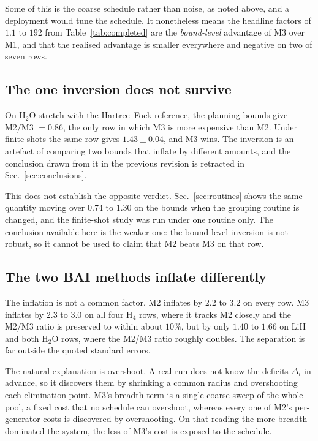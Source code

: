 \documentclass[10pt]{article}
\begin{document}
Some of this is the coarse schedule rather than noise, as noted above, and a
deployment would tune the schedule. It nonetheless means the headline factors of
$1.1$ to $192$ from Table~\ref{tab:completed} are the \emph{bound-level} advantage
of M3 over M1, and that the realised advantage is smaller everywhere and negative
on two of seven rows.

\subsection{The one inversion does not survive}

On H$_2$O stretch with the Hartree--Fock reference, the planning bounds give
M2/M3 $=0.86$, the only row in which M3 is more expensive than M2. Under finite
shots the same row gives $1.43\pm0.04$, and M3 wins. The inversion is an artefact
of comparing two bounds that inflate by different amounts, and the conclusion drawn
from it in the previous revision is retracted in Sec.~\ref{sec:conclusions}.

This does not establish the opposite verdict. Sec.~\ref{sec:routines} shows the
same quantity moving over $0.74$ to $1.30$ on the bounds when the grouping routine
is changed, and the finite-shot study was run under one routine only. The
conclusion available here is the weaker one: the bound-level inversion is not
robust, so it cannot be used to claim that M2 beats M3 on that row.

\subsection{The two BAI methods inflate differently}
\label{sec:inflate}

The inflation is not a common factor. M2 inflates by $2.2$ to $3.2$ on every row.
M3 inflates by $2.3$ to $3.0$ on all four H$_4$ rows, where it tracks M2 closely
and the M2/M3 ratio is preserved to within about $10\%$, but by only $1.40$
to $1.66$ on LiH and both H$_2$O rows, where the M2/M3 ratio roughly doubles. The
separation is far outside the quoted standard errors.

The natural explanation is overshoot. A real run does not know the deficits
$\Delta_i$ in advance, so it discovers them by shrinking a common radius and
overshooting each elimination point. M3's breadth term is a single coarse sweep of
the whole pool, a fixed cost that no schedule can overshoot, whereas every one of
M2's per-generator costs is discovered by overshooting. On that reading the more
breadth-dominated the system, the less of M3's cost is exposed to the schedule.
\end{document}
